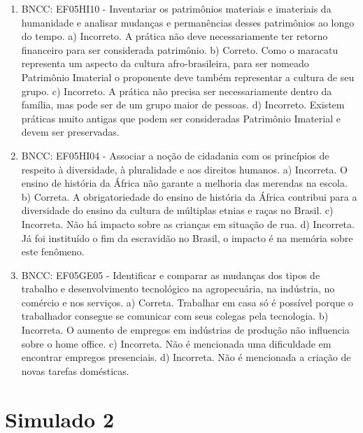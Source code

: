 \begin{enumerate}
\item
BNCC: EF05HI10 - Inventariar os patrimônios materiais e imateriais da
humanidade e analisar mudanças e permanências desses patrimônios ao
longo do tempo.
a) Incorreto. A prática não deve necessariamente ter retorno financeiro
para ser considerada patrimônio.
b) Correto. Como o maracatu representa um aspecto da cultura
afro-brasileira, para ser nomeado Patrimônio Imaterial o proponente deve
também representar a cultura de seu grupo.
c) Incorreto. A prática não precisa ser necessariamente dentro da
família, mas pode ser de um grupo maior de pessoas.
d) Incorreto. Existem práticas muito antigas que podem ser consideradas
Patrimônio Imaterial e devem ser preservadas.

\item
BNCC: EF05HI04 - Associar a noção de cidadania com os
princípios de respeito à diversidade, à pluralidade e aos direitos
humanos.
a) Incorreta. O ensino de história da África não garante a melhoria das
merendas na escola.
b) Correta. A obrigatoriedade do ensino de história da África contribui
para a diversidade do ensino da cultura de múltiplas etnias e raças no
Brasil.
c) Incorreta. Não há impacto sobre as crianças em situação de rua.
d) Incorreta. Já foi instituído o fim da escravidão no Brasil, o impacto
é na memória sobre este fenômeno.

\item
BNCC: EF05GE05 - Identificar e comparar as mudanças dos tipos
de trabalho e desenvolvimento tecnológico na agropecuária, na indústria,
no comércio e nos serviços.
a) Correta. Trabalhar em casa só é possível porque o trabalhador
consegue se comunicar com seus colegas pela tecnologia.
b) Incorreta. O aumento de empregos em indústrias de produção não
influencia sobre o home office.
c) Incorreta. Não é mencionada uma dificuldade em encontrar empregos
presenciais.
d) Incorreta. Não é mencionada a criação de novas tarefas domésticas.
\end{enumerate}

\section*{Simulado 2}

